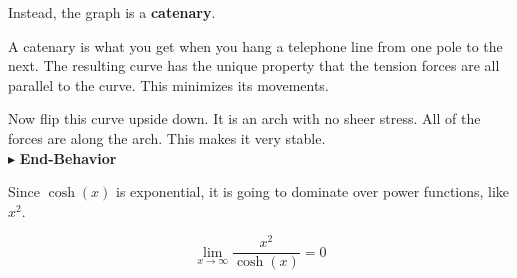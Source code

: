 \documentclass{ximera}
\begin{document}
Instead, the graph is a \textbf{catenary}.

A catenary is what you get when you hang a telephone line from one pole to the next.  The resulting curve has the unique property that the tension forces are all parallel to the curve. This minimizes its movements.

Now flip this curve upside down.  It is an arch with no sheer stress.  All of the forces are along the arch.  This makes it very stable. \\






$\blacktriangleright$ \textbf{End-Behavior}

Since $\cosh(x)$ is exponential, it is going to dominate over power functions, like $x^2$.

\[     \lim_{x \to \infty}\frac{x^2}{\cosh(x)} = 0     \]
\end{document}
